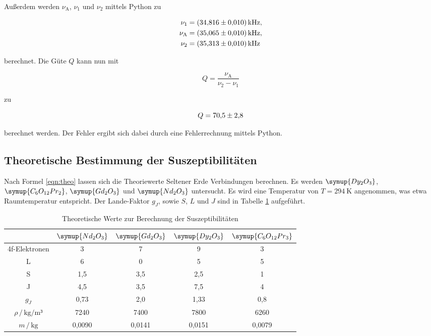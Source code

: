 Außerdem werden $\nu_\text{A}$, $\nu_1$ und $\nu_2$ mittels Python zu

\begin{align*}
\nu_1 &= \SI{34.816+-0.01}{\kilo\hertz},\\
\nu_\text{A} &= \SI{35.065+-0.01}{\kilo\hertz},\\
\nu_2 &= \SI{35.313+-0.01}{\kilo\hertz}
\end{align*}

berechnet. Die Güte $Q$ kann nun mit 

\begin{equation*}
Q = \frac{\nu_\text{A}}{\nu_2 - \nu_1}
\end{equation*}

zu 

\begin{equation*}
Q = \num{70.5+-2.8}
\end{equation*}

berechnet werden.
Der Fehler ergibt sich dabei durch eine Fehlerrechnung mittels 
Python.

\subsection{Theoretische Bestimmung der Suszeptibilitäten}

Nach Formel \eqref{eqn:theo} lassen sich die Theoriewerte Seltener 
Erde Verbindungen berechnen. Es werden $\symup{Dy_2O_3}$, $\symup{C_6O_{12}Pr_2}$, 
$\symup{Gd_2O_3}$ und $\symup{Nd_2O_3}$ untersucht. Es wird eine Temperatur von 
$T = \SI{294}{\kelvin}$ angenommen, was etwa Raumtemperatur entspricht.
Der Lande-Faktor $g_J$, sowie $S$, $L$ und $J$ sind in Tabelle \ref{tab:theo} 
aufgeführt.

\begin{table}
\centering
\caption{Theoretische Werte zur Berechnung der Suszeptibilitäten}
\label{tab:theo}
\begin{tabular}{c c c c c}
\toprule
& $\symup{Nd_2O_3}$ & $\symup{Gd_2O_3}$ & $\symup{Dy_2O_3}$ & $\symup{C_6O_{12}Pr_3}$\\
\midrule
4f-Elektronen                             & 3      & 7      & 9      & 3\\
L                                         & 6      & 0      & 5      & 5\\
S                                         & 1,5    & 3,5    & 2,5    & 1\\
J                                         & 4,5    & 3,5    & 7,5    & 4\\
$g_J$                                     & 0,73   & 2,0    & 1,33   & 0,8\\
$\rho \, / \, \si{\kilo\gram\per\meter³}$ & 7240   & 7400   & 7800   & 6260\\
$m \, / \, \si{\kilo\gram}$               & 0,0090 & 0,0141 & 0,0151 & 0,0079\\
\bottomrule
\end{tabular}
\end{table}


